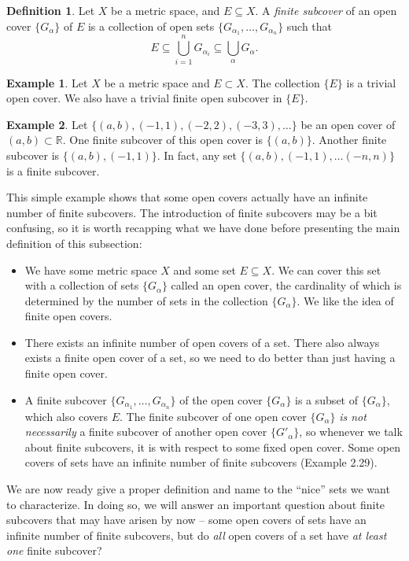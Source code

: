 \documentclass{article}
\newcommand{\R}{\mathbb{R}}
\theoremstyle{definition}
\newtheorem{definition}{Definition}[section]
\newtheorem{example}{Example}[section]
\begin{document}
\begin{definition}
Let $ X $ be a metric space, and $ E\subseteq X $. A \textit{\color{red}finite subcover} of an open cover $ \{G_\alpha\} $ of $ E $  is a collection of open sets $ \{G_{\alpha_1},\ldots,G_{\alpha_n}\} $ such that $$ E\subseteq \bigcup_{i=1}^nG_{\alpha_i}\subseteq\bigcup_\alpha G_\alpha. $$
\end{definition}
\begin{example}
	Let $ X $ be a metric space and $ E\subset X $. The collection $ \{E\} $ is a trivial open cover. We also have a trivial finite open subcover in $ \{E\} $. 
\end{example}
\begin{example}
	Let $ \{(a,b),(-1,1),(-2,2),(-3,3),\ldots\} $ be an open cover of $ (a,b)\subset \R $. One finite subcover of this open cover is $ \{(a,b)\} $. Another finite subcover is $ \{(a,b),(-1,1)\} $. In fact, any set $ \{(a,b),(-1,1),\ldots(-n,n)\} $ is a finite subcover. 
\end{example}
This simple example shows that some open covers actually have an infinite number of finite subcovers. The introduction of finite subcovers may be a bit confusing, so it is worth recapping what we have done before presenting the main definition of this subsection: 
\begin{itemize}
	\item We have some metric space $ X $ and some set $ E\subseteq X $. We can cover this set with a collection of sets $ \{G_\alpha\} $ called an open cover, the cardinality of which is determined by the number of sets in the collection $ \{G_\alpha\} $. We like the idea of finite open covers.
	\item There exists an infinite number of open covers of a set. There also always exists a finite open cover of a set, so we need to do better than just having a finite open cover.  
	\item A finite subcover $ \{G_{\alpha_1},\ldots,G_{\alpha_n}\} $ of the open cover $ \{G_\alpha\} $ is a subset of $ \{G_\alpha\} $, which also covers $ E $. The finite subcover of one open cover $ \{G_\alpha\} $ \textit{is not necessarily} a finite subcover of another open cover $ \{G'_\alpha\} $, so whenever we talk about finite subcovers, it is with respect to some fixed open cover. Some open covers of sets have an infinite number of finite subcovers (Example 2.29).
\end{itemize} 
We are now ready give a proper definition and name to the ``nice'' sets we want to characterize. In doing so, we will answer an important question about finite subcovers that may have arisen by now -- some open covers of sets have an infinite number of finite subcovers, but do \textit{all} open covers of a set have \textit{at least one} finite subcover? 
\end{document}
